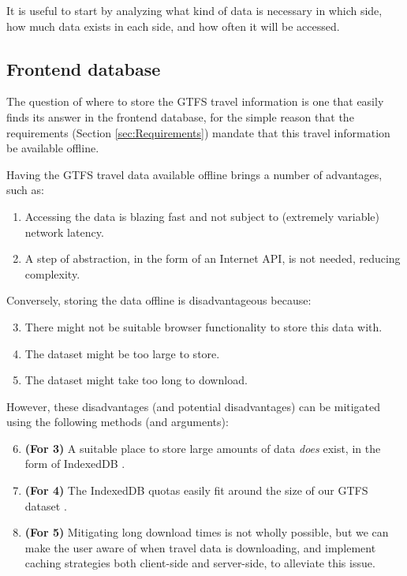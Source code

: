 It is useful to start by analyzing what kind of data is necessary in which side, how much data exists in each side, and how often it will be accessed.

\subsection{Frontend database}
The question of where to store the GTFS travel information is one that easily finds its answer in the frontend database, for the simple reason that the requirements (Section \ref{sec:Requirements}) mandate that this travel information be available offline.

Having the GTFS travel data available offline brings a number of advantages, such as:
\begin{enumerate}
    \item Accessing the data is blazing fast and not subject to (extremely variable) network latency.
    \item A step of abstraction, in the form of an Internet API, is not needed, reducing complexity.
\end{enumerate}

Conversely, storing the data offline is disadvantageous because:
\begin{enumerate}
    \setcounter{enumi}{2}
    \item There might not be suitable browser functionality to store this data with.
    \item The dataset might be too large to store.
    \item The dataset might take too long to download.
\end{enumerate}

However, these disadvantages (and potential disadvantages) can be mitigated using the following methods (and arguments):
\begin{enumerate}
    \setcounter{enumi}{5}
    \item \textbf{(For 3)} A suitable place to store large amounts of data \textit{does} exist, in the form of IndexedDB \cite{IndexedDBIntro}.
    \item \textbf{(For 4)} The IndexedDB quotas easily fit around the size of our GTFS dataset \cite{IndexedDBLimits}.
    \item \textbf{(For 5)} Mitigating long download times is not wholly possible, but we can make the user aware of when travel data is downloading, and implement caching strategies both client-side and server-side, to alleviate this issue.
\end{enumerate}

